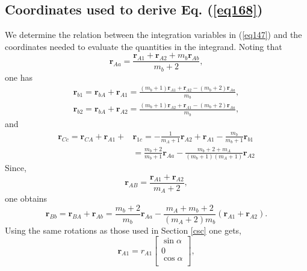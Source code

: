 \subsection{Coordinates used to derive Eq. (\ref{eq168})}
We determine the relation between the integration variables in (\ref{eq147}) and the coordinates needed to evaluate the quantities in the integrand. Noting that
\begin{equation}\label{eq177}
\mathbf{r}_{Aa}=\frac{\mathbf{r}_{A1}+\mathbf{r}_{A2}+m_b\mathbf{r}_{Ab}}{m_b+2},
\end{equation}
one has
\begin{equation}\label{eq7_2_90}
 \begin{split}
\mathbf{r}_{b1}=\mathbf{r}_{bA}+\mathbf{r}_{A1}=\frac{(m_b+1)\mathbf{r}_{A1}+\mathbf{r}_{A2}-(m_b+2)\mathbf{r}_{Aa}}{m_b},
 \end{split}
\end{equation}
\begin{equation}\label{eq178}
 \begin{split}
\mathbf{r}_{b2}=\mathbf{r}_{bA}+\mathbf{r}_{A2}=\frac{(m_b+1)\mathbf{r}_{A2}+\mathbf{r}_{A1}-(m_b+2)\mathbf{r}_{Aa}}{m_b},
 \end{split}
\end{equation}
and
\begin{equation}\label{eq7_2_93}
\begin{split}
\mathbf{r}_{Cc}=\mathbf{r}_{CA}+\mathbf{r}_{A1}+&\mathbf{r}_{1c}=
-\frac{1}{m_A+1}\mathbf{r}_{A2}+\mathbf{r}_{A1}-\frac{m_b}{m_b+1}\mathbf{r}_{b1}\\
&=\frac{m_b+2}{m_b+1}\mathbf{r}_{Aa}-\frac{m_b+2+m_A}{(m_b+1)(m_A+1)}\mathbf{r}_{A2}
\end{split}
\end{equation}
Since,
\begin{equation}\label{eq179}
\mathbf{r}_{AB}=\frac{\mathbf{r}_{A1}+\mathbf{r}_{A2}}{m_A+2},
\end{equation}
one obtains
\begin{equation}\label{eq180}
\mathbf{r}_{Bb}=\mathbf{r}_{BA}+\mathbf{r}_{Ab}=\frac{m_b+2}{m_b}\mathbf{r}_{Aa}-\frac{m_A+m_b+2}{(m_A+2)m_b}
(\mathbf{r}_{A1}+\mathbf{r}_{A2}).
\end{equation}
Using the same rotations as those used in  Section \ref{csc} one gets,
\begin{equation}\label{eq169}
\mathbf{r}_{A1}=r_{A1}
\begin{bmatrix}
  \sin\alpha\\
 0\\
 \cos\alpha\\
\end{bmatrix},
\end{equation}
